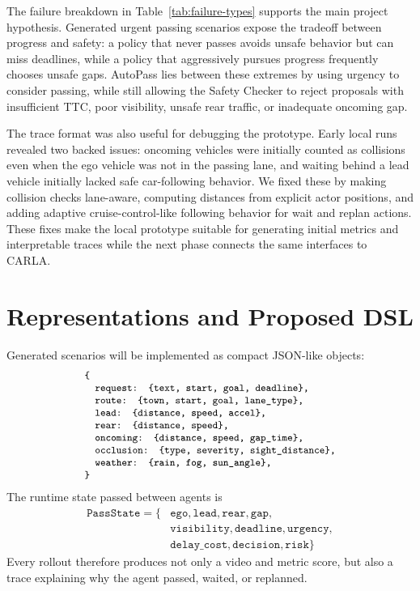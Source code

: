 \documentclass[10pt,twocolumn,letterpaper]{article}
\begin{document}
The failure breakdown in Table~\ref{tab:failure-types} supports the main project hypothesis. Generated urgent passing scenarios expose the tradeoff between progress and safety: a policy that never passes avoids unsafe behavior but can miss deadlines, while a policy that aggressively pursues progress frequently chooses unsafe gaps. AutoPass lies between these extremes by using urgency to consider passing, while still allowing the Safety Checker to reject proposals with insufficient TTC, poor visibility, unsafe rear traffic, or inadequate oncoming gap.

The trace format was also useful for debugging the prototype. Early local runs revealed two backed issues: oncoming vehicles were initially counted as collisions even when the ego vehicle was not in the passing lane, and waiting behind a lead vehicle initially lacked safe car-following behavior. We fixed these by making collision checks lane-aware, computing distances from explicit actor positions, and adding adaptive cruise-control-like following behavior for wait and replan actions. These fixes make the local prototype suitable for generating initial metrics and interpretable traces while the next phase connects the same interfaces to CARLA.

\section{Representations and Proposed DSL}
Generated scenarios will be implemented as compact JSON-like objects:
\[
\begin{small}
\begin{array}{l}
\texttt{\{}\\
\quad \texttt{request: \{text, start, goal, deadline\},}\\
\quad \texttt{route: \{town, start, goal, lane\_type\},}\\
\quad \texttt{lead: \{distance, speed, accel\},}\\
\quad \texttt{rear: \{distance, speed\},}\\
\quad \texttt{oncoming: \{distance, speed, gap\_time\},}\\
\quad \texttt{occlusion: \{type, severity, sight\_distance\},}\\
\quad \texttt{weather: \{rain, fog, sun\_angle\},}\\
\texttt{\}}
\end{array}
\end{small}
\]
The runtime state passed between agents is
\begin{align*}
\texttt{PassState} = \{&\texttt{ego}, \texttt{lead}, \texttt{rear}, \texttt{gap},\\
&\texttt{visibility}, \texttt{deadline},  \texttt{urgency}, \\
&\texttt{delay\_cost}, \texttt{decision}, \texttt{risk}\}
\end{align*}
Every rollout therefore produces not only a video and metric score, but also a trace explaining why the agent passed, waited, or replanned.
\end{document}
